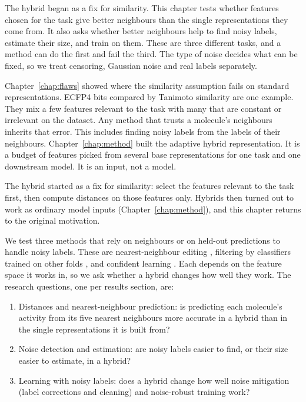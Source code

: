 The hybrid began as a fix for similarity. This chapter tests whether features chosen for the task give better neighbours than the single representations they come from. It also asks whether better neighbours help to find noisy labels, estimate their size, and train on them. These are three different tasks, and a method can do the first and fail the third. The type of noise decides what can be fixed, so we treat censoring, Gaussian noise and real labels separately.

Chapter~\ref{chap:flaws} showed where the similarity assumption fails on standard representations. ECFP4 bits compared by Tanimoto similarity are one example. They mix a few features relevant to the task with many that are constant or irrelevant on the dataset. Any method that trusts a molecule's neighbours inherits that error. This includes finding noisy labels from the labels of their neighbours. Chapter~\ref{chap:method} built the adaptive hybrid representation. It is a budget of features picked from several base representations for one task and one downstream model. It is an input, not a model.

The hybrid started as a fix for similarity: select the features relevant to the task first, then compute distances on those features only. Hybrids then turned out to work as ordinary model inputs (Chapter~\ref{chap:method}), and this chapter returns to the original motivation.

We test three methods that rely on neighbours or on held-out predictions to handle noisy labels. These are nearest-neighbour editing \citep{Wilson1972}, filtering by classifiers trained on other folds \citep{Brodley1999}, and confident learning \citep{Northcutt2021}. Each depends on the feature space it works in, so we ask whether a hybrid changes how well they work. The research questions, one per results section, are:
\begin{enumerate}
    \item Distances and nearest-neighbour prediction: is predicting each molecule's activity from its five nearest neighbours more accurate in a hybrid than in the single representations it is built from?
    \item Noise detection and estimation: are noisy labels easier to find, or their size easier to estimate, in a hybrid?
    \item Learning with noisy labels: does a hybrid change how well noise mitigation (label corrections and cleaning) and noise-robust training work?
\end{enumerate}

